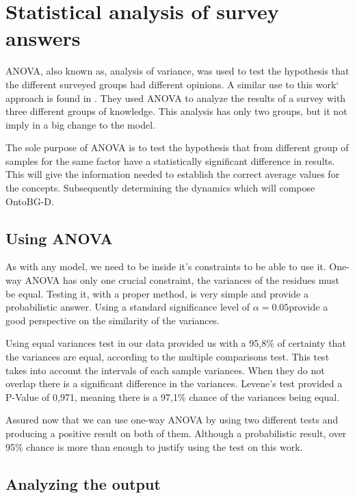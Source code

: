 \section{Statistical analysis of survey answers}

ANOVA, also known as, analysis of variance, was used to test the hypothesis that the different surveyed groups had different opinions. A similar use to this work` approach is found in \cite{ismail2007organizational}. They used ANOVA to analyze the results of a survey with three different groups of knowledge. This analysis has only two groups, but it not imply in a big change to the model.

The sole purpose of ANOVA is to test the hypothesis that from different group of samples for the same factor have a statistically significant difference in results. This will give the information needed to establish the correct average values for the concepts. Subsequently determining the dynamics which will compose OntoBG-D.

\subsection{Using ANOVA}

As with any model, we need to be inside it's constraints to be able to use it. One-way ANOVA has only one crucial constraint, the variances of the residues must be equal. Testing it, with a proper method, is very simple and provide a probabilistic answer. Using a standard significance level of $\alpha = 0.05$provide a good perspective on the similarity of the variances.

Using equal variances test in our data provided us with a 95,8\% of certainty that the variances are equal, according to the multiple comparisons test. This test takes into account the intervals of each sample variances. When they do not overlap there is a significant difference in the variances. Levene's test provided a P-Value of 0,971, meaning there is a 97,1\% chance of the variances being equal.

Assured now that we can use one-way ANOVA by using two different tests and producing a positive result on both of them. Although a probabilistic result, over 95\% chance is more than enough to justify using the test on this work. 


\subsection{Analyzing the output}

